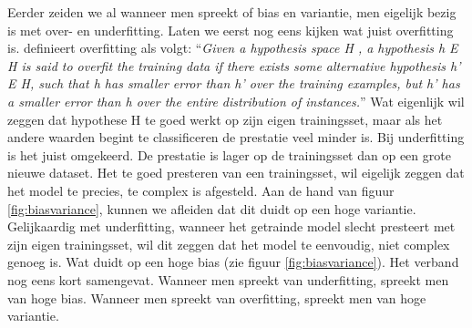 Eerder zeiden we al wanneer men spreekt of bias en variantie, men eigelijk bezig is met over- en underfitting. Laten we eerst nog eens kijken wat juist overfitting is. \citet{mitchell1997machine} definieert overfitting als volgt:
\newline
\newline
``\textit{Given a hypothesis space H , a hypothesis h E H is said to overfit the training data if there exists some alternative hypothesis h' E H, such that h has smaller error than h' over the training examples, but h' has a smaller error than h over the entire distribution of instances.}''
\newline
\newline
Wat eigenlijk wil zeggen dat hypothese H te goed werkt op zijn eigen trainingsset, maar als het andere waarden begint te classificeren de prestatie veel minder is. Bij underfitting is het juist omgekeerd. De prestatie is lager op de trainingsset dan op een grote nieuwe dataset. Het te goed presteren van een trainingsset, wil eigelijk zeggen dat het model te precies, te complex is afgesteld. Aan de hand van figuur \ref{fig:biasvariance}, kunnen we afleiden dat dit duidt op een hoge variantie. Gelijkaardig met underfitting, wanneer het getrainde model slecht presteert met zijn eigen trainingsset, wil dit zeggen dat het model te eenvoudig, niet complex genoeg is. Wat duidt op een hoge bias (zie figuur \ref{fig:biasvariance}).
%
Het verband nog eens kort samengevat. Wanneer men spreekt van underfitting, spreekt men van hoge bias. Wanneer men spreekt van overfitting, spreekt men van hoge variantie.

